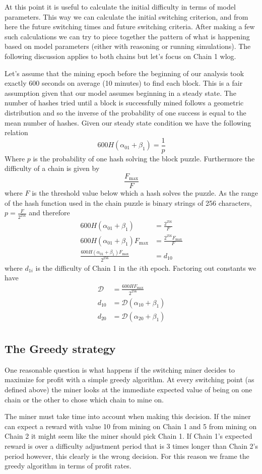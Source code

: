 \documentclass[12pt]{article}
\begin{document}
At this point it is useful to calculate the initial difficulty in terms of model parameters.  This way we can calculate the initial switching criterion, and from here the future switching times and future switching criteria.  After making a few such calculations we can try to piece together the pattern of what is happening based on model parameters (either with reasoning or running simulations).  The following discussion applies to both chains but let's focus on Chain 1 wlog.

Let's assume that the mining epoch before the beginning of our analysis took exactly 600 seconds on average (10 minutes) to find each block.  This is a fair assumption given that our model assumes beginning in a steady state.  The number of hashes tried until a block is successfully mined follows a geometric distribution and so the inverse of the probability of one success is equal to the mean number of hashes.  Given our steady state condition we have the following relation
$$
600 H(\alpha_{01} + \beta_1) = \frac{1}{p}
$$
Where $p$ is the probability of one hash solving the block puzzle.
Furthermore the difficulty of a chain is given by
$$
\frac{F_{\text{max}}}{F}
$$
where $F$ is the threshold value below which a hash solves the puzzle.  As the range of the hash function used in the chain puzzle is binary strings of 256 characters, $p = \frac{F}{2^{256}}$ and therefore
\begin{align*}
600 H(\alpha_{01} + \beta_1) &= \frac{2^{256}}{F}\\
600 H(\alpha_{01} + \beta_1)F_{\text{max}} &= \frac{2^{256}F_{\text{max}}}{F}\\
\frac{600 H(\alpha_{01} + \beta_1)F_{\text{max}} }{2^{256}} &= d_{10}
\end{align*}
where $d_{1i}$ is the difficulty of Chain 1 in the $i$th epoch.  Factoring out constants we have
\begin{align*}
\mathcal{D} &= \frac{600 HF_{\text{max}} }{2^{256}}\\
d_{10} &= \mathcal{D} (\alpha_{10} + \beta_1)\\
d_{20} &= \mathcal{D} (\alpha_{20} + \beta_1)\\
\end{align*}

\subsection*{The Greedy strategy}
One reasonable question is what happens if the switching miner decides to maximize for profit with a simple greedy algorithm.  At every switching point (as defined above) the miner looks at the immediate expected value of being on one chain or the other to chose which chain to mine on.

The miner must take time into account when making this decision.  If the miner can expect a reward with value 10 from mining on Chain 1 and 5 from mining on Chain 2 it might seem like the miner should pick Chain 1.  If Chain 1's expected reward is over a difficulty adjustment period that is 3 times longer than Chain 2's period however, this clearly is the wrong decision.  For this reason we frame the greedy algorithm in terms of profit rates.
\end{document}
